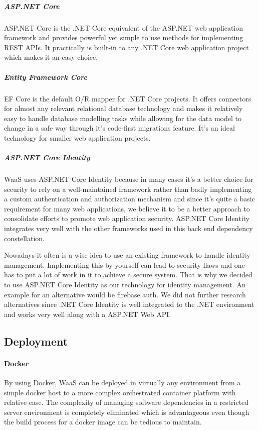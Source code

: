 \documentclass[titlepage, 12pt]{article}
\begin{document}
\subparagraph{ASP.NET Core}
ASP.NET Core is the .NET Core equivalent of the ASP.NET web application framework and provides powerful yet simple to use methods for implementing REST APIs. It practically is built-in to any
.NET Core web application project which makes it an easy choice.

\subparagraph{Entity Framework Core}
EF Core is the default O/R mapper for .NET Core projects. It offers connectors for almost any relevant relational database technology and makes it relatively easy to handle database modelling tasks
while allowing for the data model to change in a safe way through it's code-first migrations feature. It's an ideal technology for smaller web application projects.

\subparagraph{ASP.NET Core Identity}
WaaS uses ASP.NET Core Identity because in many cases it's a better choice for security to rely on a well-maintained framework rather than badly implementing a custom authentication and authorization mechanism and
since it's quite a basic requirement for many web applications, we believe it to be a better approach to consolidate efforts to promote web application security. ASP.NET Core Identity integrates very well with the other
frameworks used in this back end dependency constellation.

Nowadays it often is a wise idea to use an existing framework to handle identity management. Implementing this by yourself can lead to security flaws and one has to put a lot of work in it to achieve a secure system. That is why we decided to use ASP.NET Core Identity as our technology for identity management. An example for an alternative would be firebase auth. We did not further research alternatives since .NET Core Identity is well integrated to the .NET environment and works very well along with a ASP.NET Web API.

\subsection{Deployment}

\paragraph{Docker}
By using Docker, WaaS can be deployed in virtually any environment from a simple docker host to a more complex orchestrated container platform with relative ease.
The complexity of managing software dependencies in a restricted server environment is completely eliminated which is advantageous
even though the build process for a docker image can be tedious to maintain.
\end{document}

